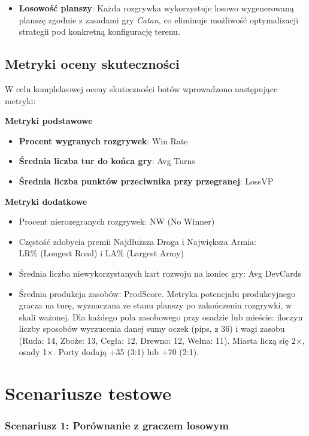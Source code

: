 \documentclass[polish,inz,longabstract]{iithesis}
\begin{document}
\begin{itemize}
\item \textbf{Losowość planszy}: Każda rozgrywka wykorzystuje losowo wygenerowaną planszę zgodnie z zasadami gry \textit{Catan}, co eliminuje możliwość optymalizacji strategii pod konkretną konfigurację terenu.
\end{itemize}

\subsection{Metryki oceny skuteczności}

W celu kompleksowej oceny skuteczności botów wprowadzono następujące metryki:

\textbf{Metryki podstawowe}
\begin{itemize}
\item \textbf{Procent wygranych rozgrywek}: Win Rate
\item \textbf{Średnia liczba tur do końca gry}: Avg Turns
\item \textbf{Średnia liczba punktów przeciwnika przy przegranej}: LossVP
\end{itemize}

\textbf{Metryki dodatkowe}
\begin{itemize}
\item Procent nierozegranych rozgrywek: NW (No Winner)
\item Częstość zdobycia premii Najdłuższa Droga i Największa Armia: \\ LR\% (Longest Road) i LA\% (Largest Army)
\item Średnia liczba niewykorzystanych kart rozwoju na koniec gry: Avg DevCards
\item Średnia produkcja zasobów: ProdScore. Metryka potencjału produkcyjnego gracza na turę, wyznaczana ze stanu planszy po zakończeniu rozgrywki, w skali ważonej. Dla każdego pola zasobowego przy osadzie lub mieście: iloczyn liczby sposobów wyrzucenia danej sumy oczek (pips, z 36) i wagi zasobu (Ruda: 14, Zboże: 13, Cegła: 12, Drewno: 12, Wełna: 11). Miasta liczą się 2×, osady 1×. Porty dodają +35 (3:1) lub +70 (2:1).
\end{itemize}

\section{Scenariusze testowe}

\subsubsection{Scenariusz 1: Porównanie z graczem losowym}
\end{document}
